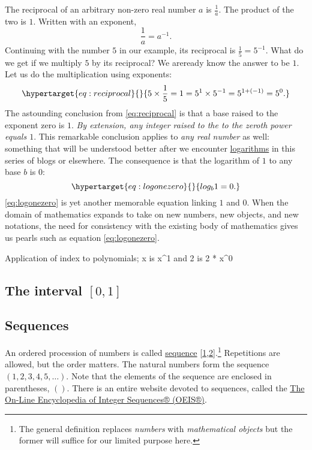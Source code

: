 \documentclass[
  a4paper,
]{article}
\begin{document}
The reciprocal of an arbitrary non-zero real number \(a\) is
\(\frac{1}{a}\). The product of the two is \(1\). Written with an
exponent, \[
\frac{1}{a} = a^{-1}.
\] Continuing with the number \(5\) in our example, its reciprocal is
\(\frac{1}{5} = 5^{-1}\). What do we get if we multiply \(5\) by its
reciprocal? We areready know the answer to be \(1\). Let us do the
multiplication using exponents:
\begin{equation}\protect\hypertarget{eq:reciprocal}{}{
5 \times \frac{1}{5} = 1 = 5^{1} \times 5^{-1} = 5^{1+(-1)} = 5^{0}.
}\label{eq:reciprocal}\end{equation} The astounding conclusion from
\cref{eq:reciprocal} is that a base raised to the exponent zero is
\({1}\). \emph{By extension, any integer raised to the to the zeroth
power equals \(1\)}. This remarkable conclusion applies to \emph{any
real number} as well: something that will be understood better after we
encounter
\href{https://www.britannica.com/science/logarithm}{logarithms} in this
series of blogs or elsewhere. The consequence is that the logarithm of
\(1\) to any base \(b\) is \(0\):
\begin{equation}\protect\hypertarget{eq:logonezero}{}{
log_{b}1 = 0.
}\label{eq:logonezero}\end{equation} \cref{eq:logonezero} is yet another
memorable equation linking \(1\) and \(0\). When the domain of
mathematics expands to take on new numbers, new objects, and new
notations, the need for consistency with the existing body of
mathematics gives us pearls such as equation \cref{eq:logonezero}.

Application of index to polynomials; x is x\^{}1 and 2 is 2 * x\^{}0

\hypertarget{the-interval-0-1}{%
\subsection{\texorpdfstring{The interval
\([0, 1]\)}{The interval {[}0, 1{]}}}\label{the-interval-0-1}}

\hypertarget{sequences}{%
\subsection{Sequences}\label{sequences}}

An ordered procession of numbers is called
\href{https://en.wikipedia.org/w/index.php?title=Sequence\&oldid=1177801065}{sequence}
{[}\protect\hyperlink{ref-wikisequence}{1},\protect\hyperlink{ref-wolframsequence}{2}{]}.\footnote{The
  general definition replaces \emph{numbers} with \emph{mathematical
  objects} but the former will suffice for our limited purpose here.}
Repetitions are allowed, but the order matters. The natural numbers form
the sequence \((1, 2, 3, 4, 5, \ldots)\). Note that the elements of the
sequence are enclosed in parentheses, \(()\). There is an entire website
devoted to sequences, called the \href{https://oeis.org/}{The On-Line
Encyclopedia of Integer Sequences® (OEIS®)}.
\end{document}
